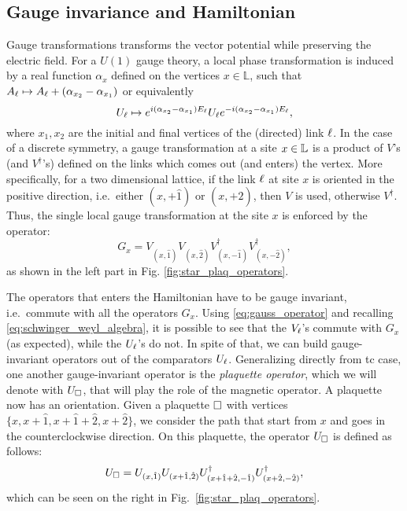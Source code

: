 %
%
\subsection{Gauge invariance and Hamiltonian}%
\label{sub:gauge_invariance_and_hamiltonian}

Gauge transformations transforms the vector potential while preserving the electric field.
For a $U(1)$ gauge theory, a local phase transformation is induced by a real function $\alpha_x$
defined on the vertices $x\in \mathbb L$, such that  $A_{\ell} \mapsto A_{\ell} + (\alpha_{x_2} - \alpha_{x_1})$ or equivalently
\begin{equation}
    U_{\ell} \mapsto
    e^{i(\alpha_{x_2} - \alpha_{x_1}) E_{\ell}}  U_{\ell}   e^{-i(\alpha_{x_2} - \alpha_{x_1} )E_{\ell}},
\end{equation}
where $x_1, x_2$ are the initial and final vertices of the (directed) link $\ell$.
In the case of a discrete symmetry, a gauge transformation at a site $x \in \mathbb{L}$ is a product of $V$'s (and $V^\dagger$'s) defined on the links which comes out (and enters) the vertex.
More specifically, for a two dimensional lattice,
if the link $\ell$ at site $x$ is oriented in the positive direction, i.e.~either $(x, +\hat{1})$ or $(x, +\hat{2})$, then $V$ is used, otherwise $V^\dagger$.
Thus, the single local gauge transformation at the site $x$ is enforced by the operator:
\begin{equation}
    G_x =
    V_{(x, \hat{1})}^{\phantom{\dagger}}
    V_{(x, \hat{2})}^{\phantom{\dagger}}
    V^\dagger_{(x, -\hat{1})}
    V^\dagger_{(x, -\hat{2})},
    \label{eq:gauss_operator}
\end{equation}
as shown in the left part in Fig. \ref{fig:star_plaq_operators}.

The operators that enters the Hamiltonian have to be gauge invariant, i.e.~commute with all the operators $G_x$.
Using \eqref{eq:gauss_operator} and recalling \eqref{eq:schwinger_weyl_algebra}, it is possible to see that the $V_\ell$'s commute with $G_x$ (as expected), while the $U_\ell$'s do not.
In spite of that, we can build gauge-invariant operators out of the comparators $U_\ell$.
Generalizing directly from \ac{tc} case, one another gauge-invariant operator is the \emph{plaquette operator}, which we will denote with $U_{\square}$, that will play the role of the magnetic operator.
A plaquette now has an orientation.
Given a plaquette $\square$ with vertices $\{x, x+\hat{1}, x+\hat{1}+\hat{2}, x+\hat{2}\}$, we consider the path that start from $x$ and goes in the counterclockwise direction.
On this plaquette, the operator $U_{\square}$ is defined as follows:
\begin{equation}
    U_{\square} =
    U_{(x, \hat{1})}
    U_{(x + \hat{1}, \hat{2})}
    U_{(x + \hat{1} + \hat{2}, -\hat{1})}^\dagger
    U_{(x + \hat{2}, -\hat{2})}^\dagger,
    \label{eq:plaq_operator}
\end{equation}
which can be seen on the right in Fig.~\ref{fig:star_plaq_operators}.

